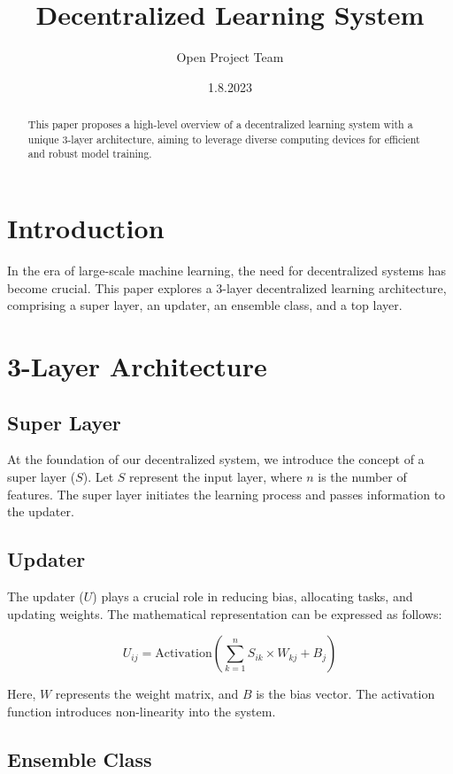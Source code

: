 \documentclass{article}
\title{Decentralized Learning System}
\author{Open Project Team}
\date{1.8.2023}
\begin{document}
\maketitle

\begin{abstract}
  This paper proposes a high-level overview of a decentralized learning system with a unique 3-layer architecture, aiming to leverage diverse computing devices for efficient and robust model training.
\end{abstract}

\section{Introduction}

In the era of large-scale machine learning, the need for decentralized systems has become crucial. This paper explores a 3-layer decentralized learning architecture, comprising a super layer, an updater, an ensemble class, and a top layer.

\section{3-Layer Architecture}

\subsection{Super Layer}

At the foundation of our decentralized system, we introduce the concept of a super layer ($S$). Let $S$ represent the input layer, where $n$ is the number of features. The super layer initiates the learning process and passes information to the updater.

\subsection{Updater}

The updater ($U$) plays a crucial role in reducing bias, allocating tasks, and updating weights. The mathematical representation can be expressed as follows:

\[
U_{ij} = \text{Activation}\left(\sum_{k=1}^{n} S_{ik} \times W_{kj} + B_j\right)
\]

Here, $W$ represents the weight matrix, and $B$ is the bias vector. The activation function introduces non-linearity into the system.

\subsection{Ensemble Class}
\end{document}

